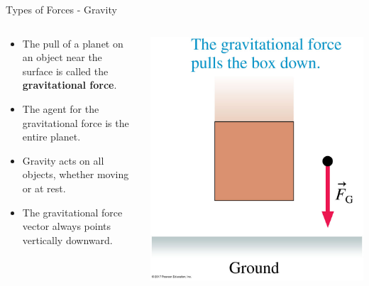 \documentclass{beamer}
\begin{document}
\begin{frame}{Types of Forces - Gravity}
\begin{columns}
\begin{column}{0.5\textwidth}
\begin{itemize}
   \item The pull of a planet on an object near the surface is called the {\bf gravitational force}.
   \item The agent for the gravitational force is the entire planet.
   \item Gravity acts on all objects, whether moving or at rest.
   \item The gravitational force vector always points vertically downward.
\end{itemize}
\end{column}
\begin{column}{0.5\textwidth}
\begin{center}
   \includegraphics[width=\textwidth]{../figures/05_03_Figure.jpg}
\end{center}
\end{column}
\end{columns}
\end{frame}
\end{document}
